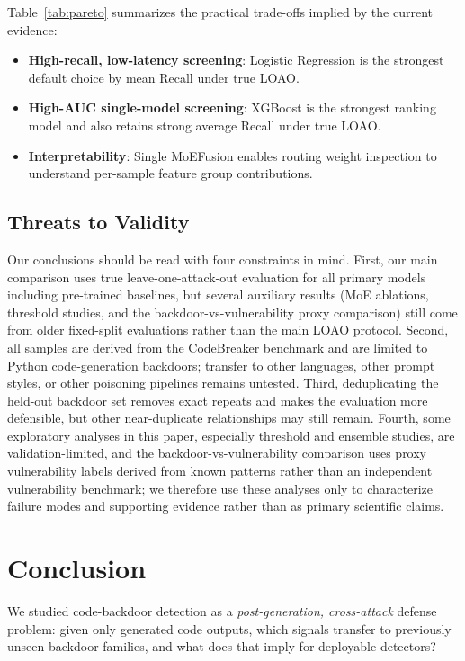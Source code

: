 ﻿\documentclass[sigconf,review,anonymous]{acmart}
\newcommand{\sys}{MoEFusion}
\begin{document}
Table~\ref{tab:pareto} summarizes the practical trade-offs implied by the
current evidence:

\begin{itemize}
\item \textbf{High-recall, low-latency screening}: Logistic Regression is the
  strongest default choice by mean Recall under true LOAO.
\item \textbf{High-AUC single-model screening}: XGBoost is the strongest
  ranking model and also retains strong average Recall under true LOAO.
\item \textbf{Interpretability}: Single \sys{} enables routing weight inspection
  to understand per-sample feature group contributions.
\end{itemize}

\subsection{Threats to Validity}

Our conclusions should be read with four constraints in mind.
First, our main comparison uses true leave-one-attack-out evaluation for all
primary models including pre-trained baselines, but several auxiliary results
(MoE ablations, threshold studies, and the backdoor-vs-vulnerability proxy
comparison) still come from older fixed-split evaluations rather than the main
LOAO protocol.
Second, all samples are derived from the CodeBreaker benchmark and are limited
to Python code-generation backdoors; transfer to other languages, other prompt
styles, or other poisoning pipelines remains untested.
Third, deduplicating the held-out backdoor set removes exact repeats and makes
the evaluation more defensible, but other near-duplicate relationships may
still remain.
Fourth, some exploratory analyses in this paper, especially threshold and
ensemble studies, are validation-limited, and the backdoor-vs-vulnerability
comparison uses proxy vulnerability labels derived from known patterns rather
than an independent vulnerability benchmark; we therefore use these analyses
only to characterize failure modes and supporting evidence rather than as
primary scientific claims.


\section{Conclusion}
\label{sec:conclusion}

We studied code-backdoor detection as a \emph{post-generation, cross-attack}
defense problem: given only generated code outputs, which signals transfer to
previously unseen backdoor families, and what does that imply for deployable
detectors?
\end{document}
